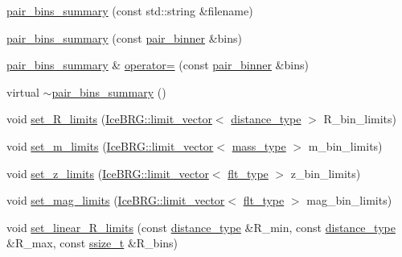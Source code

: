 \begin{DoxyCompactItemize}
\item 
\hyperlink{classIceBRG_1_1pair__bins__summary_a082924adf96c1604f88e73b5b3bcc87d}{pair\+\_\+bins\+\_\+summary} (const std\+::string \&filename)
\item 
\hyperlink{classIceBRG_1_1pair__bins__summary_aa031c76c0717dd77232f44fae2cb8bdd}{pair\+\_\+bins\+\_\+summary} (const \hyperlink{classIceBRG_1_1pair__binner}{pair\+\_\+binner} \&bins)
\item 
\hyperlink{classIceBRG_1_1pair__bins__summary}{pair\+\_\+bins\+\_\+summary} \& \hyperlink{classIceBRG_1_1pair__bins__summary_af1d9f93977eb8f7b17e397933a71f70c}{operator=} (const \hyperlink{classIceBRG_1_1pair__binner}{pair\+\_\+binner} \&bins)
\item 
virtual \hyperlink{classIceBRG_1_1pair__bins__summary_a20297356c0eea3b163c3f68fd9e001eb}{$\sim$pair\+\_\+bins\+\_\+summary} ()
\item 
void \hyperlink{classIceBRG_1_1pair__bins__summary_a8a65637499aead61fecf9dc057158a55}{set\+\_\+\+R\+\_\+limits} (\hyperlink{classIceBRG_1_1limit__vector}{Ice\+B\+R\+G\+::limit\+\_\+vector}$<$ \hyperlink{namespaceIceBRG_a45499647eb87e24c10ab32c628711cec}{distance\+\_\+type} $>$ R\+\_\+bin\+\_\+limits)
\item 
void \hyperlink{classIceBRG_1_1pair__bins__summary_a01a6131459f8f68a5d704c46885fcc9b}{set\+\_\+m\+\_\+limits} (\hyperlink{classIceBRG_1_1limit__vector}{Ice\+B\+R\+G\+::limit\+\_\+vector}$<$ \hyperlink{namespaceIceBRG_a1be72ac4918a9b029f2eefa084213e35}{mass\+\_\+type} $>$ m\+\_\+bin\+\_\+limits)
\item 
void \hyperlink{classIceBRG_1_1pair__bins__summary_a6625df1c0eb2c288e9e5b62d2222a3ca}{set\+\_\+z\+\_\+limits} (\hyperlink{classIceBRG_1_1limit__vector}{Ice\+B\+R\+G\+::limit\+\_\+vector}$<$ \hyperlink{lib_2IceBRG__main_2common_8h_ad0f130a56eeb944d9ef2692ee881ecc4}{flt\+\_\+type} $>$ z\+\_\+bin\+\_\+limits)
\item 
void \hyperlink{classIceBRG_1_1pair__bins__summary_a21c1b01b73f7b86666afd9f54e72b145}{set\+\_\+mag\+\_\+limits} (\hyperlink{classIceBRG_1_1limit__vector}{Ice\+B\+R\+G\+::limit\+\_\+vector}$<$ \hyperlink{lib_2IceBRG__main_2common_8h_ad0f130a56eeb944d9ef2692ee881ecc4}{flt\+\_\+type} $>$ mag\+\_\+bin\+\_\+limits)
\item 
void \hyperlink{classIceBRG_1_1pair__bins__summary_a664ff45e62edaef88f333fdbfcfe52af}{set\+\_\+linear\+\_\+\+R\+\_\+limits} (const \hyperlink{namespaceIceBRG_a45499647eb87e24c10ab32c628711cec}{distance\+\_\+type} \&R\+\_\+min, const \hyperlink{namespaceIceBRG_a45499647eb87e24c10ab32c628711cec}{distance\+\_\+type} \&R\+\_\+max, const \hyperlink{lib_2IceBRG__main_2common_8h_ab322a3e50421dc5f0c43316b1b373592}{ssize\+\_\+t} \&R\+\_\+bins)

\end{DoxyCompactItemize}
